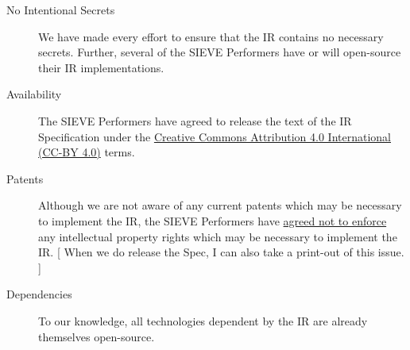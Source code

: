 \begin{description}
  \item[No Intentional Secrets] We have made every effort to ensure that the IR contains no necessary secrets. Further, several of the SIEVE Performers have or will open-source their IR implementations.
  \item[Availability] The SIEVE Performers have agreed to release the text of the IR Specification under the \href{https://creativecommons.org/licenses/by/4.0/}{Creative Commons Attribution 4.0 International (CC-BY 4.0)} terms.
  \item[Patents] Although we are not aware of any current patents which may be necessary to implement the IR, the SIEVE Performers have \href{https://github.mit.edu/sieve-all/collaboration/issues/30}{agreed not to enforce} any intellectual property rights which may be necessary to implement the IR.
    [ When we do release the Spec, I can also take a print-out of this issue. ]
  \item[Dependencies] To our knowledge, all technologies dependent by the IR are already themselves open-source.
\end{description}
